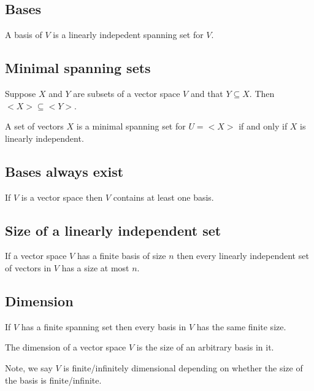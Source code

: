 \documentclass[12pt]{article}
\begin{document}
	\subsection{Bases}
	\begin{defn}
		A basis of $V$ is a linearly indepedent spanning set for $V$.
	\end{defn}
	
	\subsection{Minimal spanning sets}
	\begin{thm}
		Suppose $X$ and $Y$ are subsets of a vector space $V$ and that $Y \subseteq X$. Then $<X> \subseteq <Y>$.
	\end{thm}
	
	\begin{thm}
		A set of vectors $X$ is a minimal spanning set for $U = <X>$ if and only if $X$ is linearly independent.
	\end{thm}
	
	\subsection{Bases always exist}
	\begin{thm}
		If $V$ is a vector space then $V$ contains at least one basis.
	\end{thm}
	
	\subsection{Size of a linearly independent set}
	\begin{thm}
		If a vector space $V$ has a finite basis of size $n$ then every linearly independent set of vectors in $V$ has a size at most $n$.
	\end{thm}
	
	\subsection{Dimension}
	\begin{crl}
		If $V$ has a finite spanning set then every basis in $V$ has the same finite size.
	\end{crl}
	
	\begin{defn}
		The dimension of a vector space $V$ is the size of an arbitrary basis in it.
	\end{defn}
	Note, we say $V$ is finite/infinitely dimensional depending on whether the size of the basis is finite/infinite.
	
\end{document}
